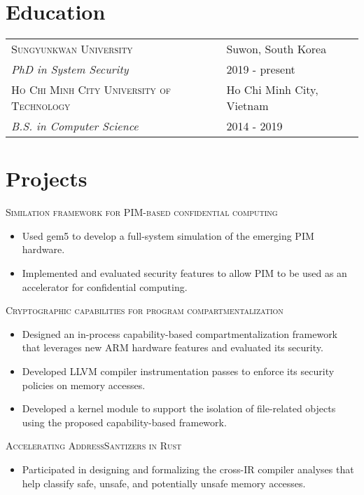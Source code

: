 \documentclass[a4paper,12pt]{article}
\begin{document}
\section{Education}
\begin{tabularx}{\linewidth}{@{}lX@{}}	
\textsc{Sungyunkwan University} & \hfill Suwon, South Korea\\
\emph{PhD in System Security} & \hfill  2019 - present   \\
\textsc{Ho Chi Minh City University of Technology} & \hfill Ho Chi Minh City, Vietnam\\
\emph{B.S. in Computer Science} & \hfill  2014 - 2019   \\
\end{tabularx}

\section{Projects}

\textsc{Similation framework for PIM-based confidential computing}
\begin{itemize}[nosep,after=\strut, leftmargin=2em, itemsep=3pt]
    \item Used gem5 to develop a full-system simulation of the emerging PIM hardware.
    \item Implemented and evaluated security features to allow PIM to be used as an accelerator for confidential computing.
\end{itemize}

\textsc{Cryptographic capabilities for program compartmentalization}
\begin{itemize}[nosep,after=\strut, leftmargin=2em, itemsep=3pt]
    \item Designed an in-process capability-based compartmentalization framework that leverages new ARM hardware features and evaluated its security.
    \item Developed LLVM compiler instrumentation passes to enforce its security policies on memory accesses.
    \item Developed a kernel module to support the isolation of file-related objects using the proposed capability-based framework.
\end{itemize}

\textsc{Accelerating AddressSantizers in Rust}
\begin{itemize}[nosep,after=\strut, leftmargin=2em, itemsep=3pt]
    \item Participated in designing and formalizing the cross-IR compiler analyses that help classify safe, unsafe, and potentially unsafe memory accesses. 
\end{itemize}
\end{document}
